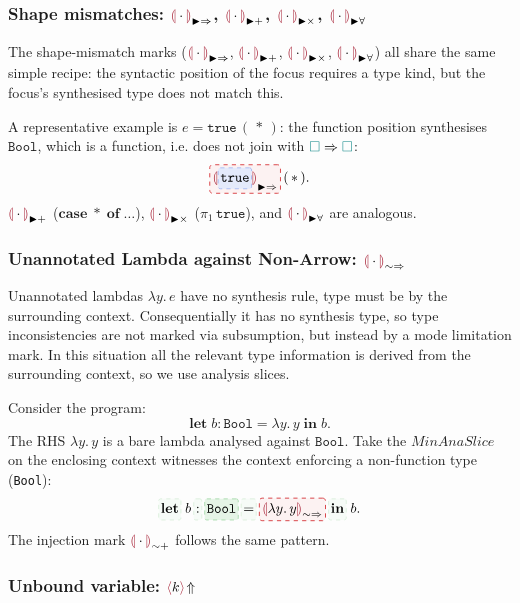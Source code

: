 \subsubsection{Shape mismatches: $\markarrow$, $\marksum$, $\markprod$, $\markforall$}
\label{sec:marking-recipes-shape}

The shape-mismatch marks ($\markarrow$, $\marksum$, $\markprod$, $\markforall$) all share the same simple recipe: the syntactic position of the focus requires a type kind, but the focus's synthesised type does not match this.

A representative example is $e = \texttt{true}\,(\,*\,)$: the function position synthesises $\texttt{Bool}$, which is a function, i.e. does not join with ${\color{teal}\Box} \Rightarrow {\color{teal}\Box}$:
\[
  \markbox{\markarrow[\sli{\texttt{true}}]}\,(\,*\,).
\]
$\marksum$ ($\mathbf{case}\;*\;\mathbf{of}\;\ldots$), $\markprod$ ($\pi_1\,\texttt{true}$), and $\markforall$ are analogous.

\subsubsection{Unannotated Lambda against Non-Arrow: \texorpdfstring{$\marklam$}{bare-lambda}}
\label{sec:marking-recipes-lam}

Unannotated lambdas $\lambda y.\,e$ have no synthesis rule, type must be
by the surrounding context. Consequentially it has
no synthesis type, so type inconsistencies are not marked via subsumption, but instead by a mode limitation mark. In this situation all the relevant type information is derived from the surrounding context, so we use analysis slices.

Consider the program:
\[
  \mathbf{let}\;b : \texttt{Bool} = \lambda y.\,y\;\mathbf{in}\;b.
\]
The RHS $\lambda y.\,y$ is a bare lambda analysed against
$\texttt{Bool}$. Take the $\mathit{MinAnaSlice}$ on the enclosing context witnesses the context enforcing a non-function type (\texttt{Bool}):
\[
  \slist{\mathbf{let}}\;b\,\slist{:}\,\sli[OliveGreen]{\texttt{Bool}}\,\slist{=}\,
  \markbox{\marklam[\lambda y.\,y]}\,\slist{\mathbf{in}}\;b.
\]
The injection mark $\markinj$ follows the same pattern.

\subsubsection{Unbound variable: \texorpdfstring{$\markvar{k}$}{unbound}}
\label{sec:marking-recipes-unbound}

